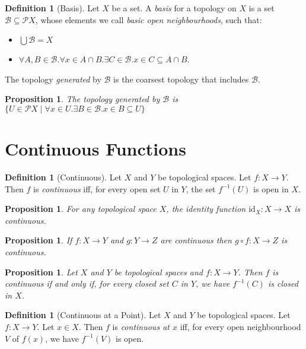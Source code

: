 \documentclass{book}
\newtheorem{prop}[ax]{Proposition}
\theoremstyle{definition}
\newtheorem{df}[ax]{Definition}
\newcommand{\id}[1]{\ensuremath{\mathrm{id}_{#1}}}
\begin{document}
\begin{df}[Basis]
Let $X$ be a set. A \emph{basis} for a topology on $X$ is a set $\mathcal{B} \subseteq \mathcal{P} X$, whose elements we call \emph{basic open neighbourhoods}, such that:
\begin{itemize}
\item $\bigcup \mathcal{B} = X$
\item $\forall A,B \in \mathcal{B}. \forall x \in A \cap B. \exists C \in \mathcal{B}. x \in C \subseteq A \cap B$.
\end{itemize}
The topology \emph{generated} by $\mathcal{B}$ is the coarsest topology that includes $\mathcal{B}$.
\end{df}

\begin{prop}
The topology generated by $\mathcal{B}$ is $\{ U \in \mathcal{P} X \mid \forall x \in U. \exists B \in \mathcal{B}. x \in B \subseteq U \}$
\end{prop}

\section{Continuous Functions}

\begin{df}[Continuous]
Let $X$ and $Y$ be topological spaces. Let $f : X \rightarrow Y$. Then $f$ is \emph{continuous} iff, for every open set $U$ in $Y$, the set $f^{-1}(U)$ is open in $X$.
\end{df}

\begin{prop}
For any topological space $X$, the identity function $\id{X} : X \rightarrow X$ is continuous.
\end{prop}

\begin{prop}
If $f : X \rightarrow Y$ and $g : Y \rightarrow Z$ are continuous then $g \circ f : X \rightarrow Z$ is continuous.
\end{prop}

\begin{prop}
Let $X$ and $Y$ be topological spaces and $f : X \rightarrow Y$. Then $f$ is continuous if and only if, for every closed set $C$ in $Y$, we have $f^{-1}(C)$ is closed in $X$.
\end{prop}

\begin{df}[Continuous at a Point]
Let $X$ and $Y$ be topological spaces. Let $f : X \rightarrow Y$. Let $x \in X$. Then $f$ is \emph{continuous at $x$} iff, for every open neighbourhood $V$ of $f(x)$, we have $f^{-1}(V)$ is open.
\end{df}
\end{document}
